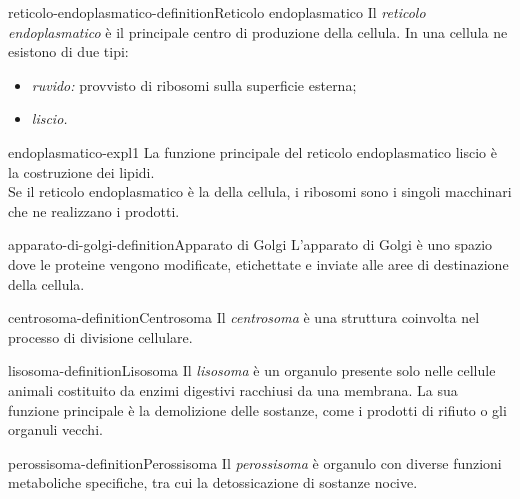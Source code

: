 \documentclass[preview]{standalone}
\begin{document}
\begin{snippetdefinition}{reticolo-endoplasmatico-definition}{Reticolo endoplasmatico}
    Il \textit{reticolo endoplasmatico} è il principale centro di produzione
    della cellula.
    In una cellula ne esistono di due tipi:
    \begin{itemize}
        \item \textit{ruvido:} provvisto di ribosomi sulla superficie esterna;
        \item \textit{liscio.}
    \end{itemize}
\end{snippetdefinition}

\begin{snippet}{endoplasmatico-expl1}
    La funzione principale del reticolo endoplasmatico liscio è
    la costruzione dei lipidi.\\
    Se il reticolo endoplasmatico è la  della cellula, i ribosomi sono i singoli macchinari che ne
    realizzano i prodotti.
\end{snippet}

\begin{snippetdefinition}{apparato-di-golgi-definition}{Apparato di Golgi}
    L'apparato di Golgi è uno spazio dove le proteine
    vengono modificate, etichettate e inviate alle aree di destinazione della cellula.
\end{snippetdefinition}


\begin{snippetdefinition}{centrosoma-definition}{Centrosoma}
    Il \textit{centrosoma} è una struttura coinvolta nel processo di divisione cellulare.
\end{snippetdefinition}

\begin{snippetdefinition}{lisosoma-definition}{Lisosoma}
    Il \textit{lisosoma} è un organulo presente solo nelle cellule animali costituito da enzimi digestivi
    racchiusi da una membrana.
    La sua funzione principale è la demolizione delle sostanze,
    come i prodotti di rifiuto o gli organuli vecchi.
\end{snippetdefinition}

\begin{snippetdefinition}{perossisoma-definition}{Perossisoma}
    Il \textit{perossisoma} è organulo con diverse funzioni metaboliche specifiche, tra cui la detossicazione di
    sostanze nocive.
\end{snippetdefinition}
\end{document}
